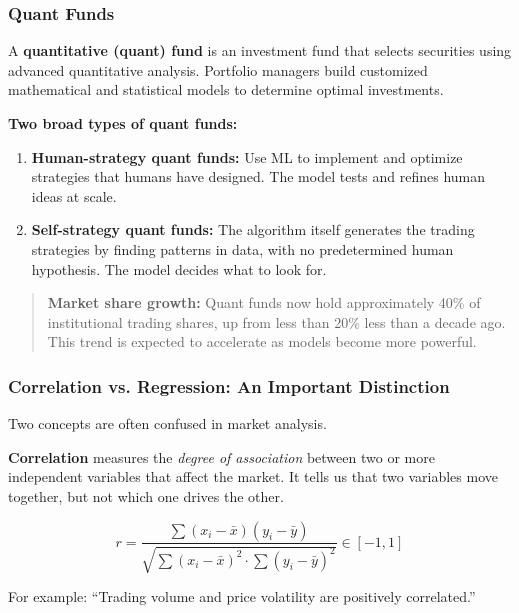 \documentclass[12pt,openany]{book}
\begin{document}
\subsubsection{Quant Funds}

A \textbf{quantitative (quant) fund} is an investment fund that selects securities using advanced quantitative analysis. Portfolio managers build customized mathematical and statistical models to determine optimal investments.

\textbf{Two broad types of quant funds:}
\begin{enumerate}[leftmargin=*]
    \item \textbf{Human-strategy quant funds:} Use ML to implement and optimize strategies that humans have designed. The model tests and refines human ideas at scale.
    \item \textbf{Self-strategy quant funds:} The algorithm itself generates the trading strategies by finding patterns in data, with no predetermined human hypothesis. The model decides what to look for.
\end{enumerate}

\begin{quote}
\textbf{Market share growth:} Quant funds now hold approximately 40\% of institutional trading shares, up from less than 20\% less than a decade ago. This trend is expected to accelerate as models become more powerful.
\end{quote}

\subsubsection{Correlation vs. Regression: An Important Distinction}

Two concepts are often confused in market analysis.

\textbf{Correlation} measures the \textit{degree of association} between two or more independent variables that affect the market. It tells us that two variables move together, but not which one drives the other.

\begin{equation*}
    r = \frac{\sum (x_i - \bar{x})(y_i - \bar{y})}
    {\sqrt{\sum (x_i - \bar{x})^2 \cdot \sum (y_i - \bar{y})^2}} \in [-1, 1]
\end{equation*}

For example: ``Trading volume and price volatility are positively correlated.''
\end{document}
